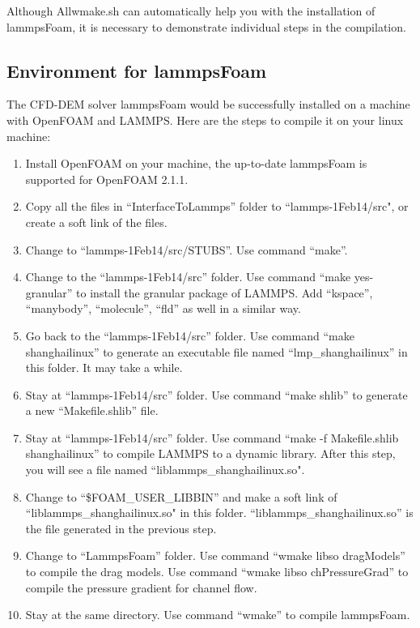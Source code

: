 \documentclass[11pt]{article}
\begin{document}
Although Allwmake.sh can automatically help you with the installation of lammpsFoam, it is necessary
to demonstrate individual steps in the compilation.

\subsection{Environment for lammpsFoam}
The CFD-DEM solver lammpsFoam would be successfully installed on a machine with OpenFOAM and LAMMPS.
Here are the steps to compile it on your linux machine:
\begin{enumerate}
    \item Install OpenFOAM on your machine, the up-to-date lammpsFoam is supported for OpenFOAM
        2.1.1.
    \item Copy all the files in ``InterfaceToLammps'' folder to ``lammps-1Feb14/src", or create a
        soft link of the files.
    \item Change to ``lammps-1Feb14/src/STUBS''. Use command ``make''.
    \item Change to the ``lammps-1Feb14/src'' folder. Use command ``make yes-granular'' to install
        the granular package of LAMMPS. Add ``kspace'', ``manybody'', ``molecule'', ``fld'' as well
        in a similar way.
    \item Go back to the ``lammps-1Feb14/src'' folder. Use command ``make shanghailinux'' to
        generate an executable file named ``lmp\_shanghailinux'' in this folder. It may take a
        while.
    \item Stay at ``lammps-1Feb14/src'' folder. Use command ``make shlib'' to generate a new
        ``Makefile.shlib'' file.
    \item Stay at ``lammps-1Feb14/src'' folder. Use command ``make -f Makefile.shlib shanghailinux''
        to compile LAMMPS to a dynamic library. After this step, you will see a file named
        ``liblammps\_shanghailinux.so".
    \item Change to ``\$FOAM\_USER\_LIBBIN'' and make a soft link of ``liblammps\_shanghailinux.so"
        in this folder. ``liblammps\_shanghailinux.so'' is the file generated in the previous step.
    \item Change to ``LammpsFoam'' folder. Use command ``wmake libso dragModels'' to compile the
        drag models. Use command ``wmake libso chPressureGrad'' to compile the pressure gradient for
        channel flow.
    \item Stay at the same directory. Use command ``wmake'' to compile lammpsFoam.
\end{enumerate}
\end{document}
